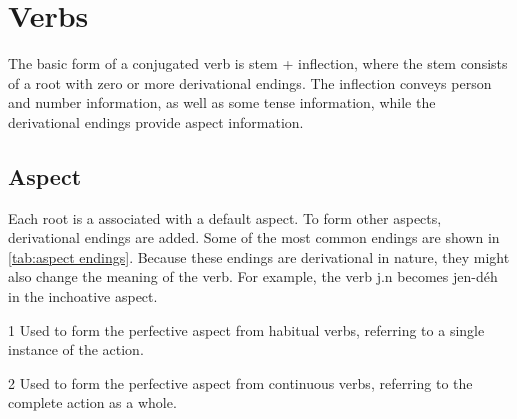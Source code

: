 \section{Verbs}
The basic form of a conjugated verb is stem + inflection, where the stem
consists of a root with zero or more derivational endings. The inflection
conveys person and number information, as well as some tense information, while
the derivational endings provide aspect information.

\subsection{Aspect}
Each root is a associated with a default aspect. To form other aspects,
derivational endings are added. Some of the most common endings are shown in
\cref{tab:aspect endings}. Because these endings are derivational in
nature, they might also change the meaning of the verb. For example, the verb
{\ll j.n}  becomes {\ll jen-déh}  in the inchoative
aspect.

\begin{table}[h]
\centering
\caption{Aspect Endings}
\label{tab:aspect endings}
\begin{threeparttable}
\begin{tablenotes}
\item[1] Used to form the perfective aspect from habitual verbs, referring to a
    single instance of the action.
\item[2] Used to form the perfective aspect from continuous verbs, referring to
    the complete action as a whole.
\end{tablenotes}
\end{threeparttable}
\end{table}

